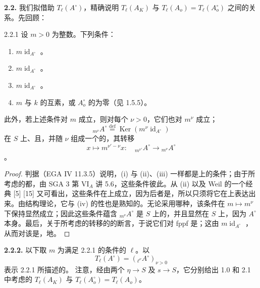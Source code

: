 \textbf{2.2.} 我们拟借助 $T_\ell(A^\circ)$，精确说明 $T_\ell(A_K)$ 与 $T_\ell(A_o)=T_\ell(A_o^\circ)$ 之间的关系。先回顾：
\begin{SGAresult}{}{2.2.1}
设 $m>0$ 为整数。下列条件：
\begin{enumerate}
\item[(i)] $m\operatorname{id}_{A^\circ}$ 。
\item[(ii)] $m\operatorname{id}_{A^\circ}$ 。
\item[(iii)] $m\operatorname{id}_{A^\circ}$ 。
\item[(iv)] $m$ 与 $k$ 的互素，或 $A_o^\circ$ 的为零（见 1.5.5）。
\end{enumerate}
此外，若上述条件对 $m$ 成立，则对每个 $\nu>0$，它们也对 $m^\nu$ 成立；
\[{}_{m^\nu}A^\circ\overset{\mathrm{def}}=\operatorname{Ker}(m^\nu\operatorname{id}_{A^\circ})\]
在 $S$ 上、且，并随 $\nu$ 组成一个的，其转移
\[x\longmapsto m^{\nu'-\nu}x:\quad{}_{m^{\nu'}}A^\circ\longrightarrow{}_{m^\nu}A^\circ\]
。
\end{SGAresult}
\begin{proof}
判据（EGA IV 11.3.5）说明，(i) 与 (ii)、(iii) 一样都是上的条件；由于所考虑的都，由 SGA 3 第 VI$_A$ 讲 5.6，这些条件彼此。从 (ii) 以及 Weil 的一个经典 [5] [15] 又可看出，这些条件在上成立，因为后者是，所以只须将它在上表达出来。由结构理论，它与 (iv) 的性也是熟知的。无论采用哪种，该条件在 $m\mapsto m^\nu$ 下保持显然成立；因此这些条件蕴含 ${}_{m^\nu}A^\circ$ 是 $S$ 上的，并且显然在 $S$ 上，因为 $A^\circ$ 本身。最后，关于所考虑的转移的的断言，于说它们对 fppf 是；这由 $m\operatorname{id}_{A^\circ}$ ，从而对该是，地。
\end{proof}
\textbf{2.2.2.} 以下取 $m$ 为满足 2.2.1 的条件的 $\ell$。以
\[T_\ell(A^\circ)=({}_{\ell^\nu}A^\circ)_{\nu>0}\tag{2.2.2.1}\]
表示 2.2.1 所描述的。
注意，经由两个 $\eta\to S$ 及 $s\to S$，它分别给出 1.0 和 2.1 中考虑的 $T_\ell(A_K)$ 与 $T_\ell(A_o^\circ)=T_\ell(A_o)$。

